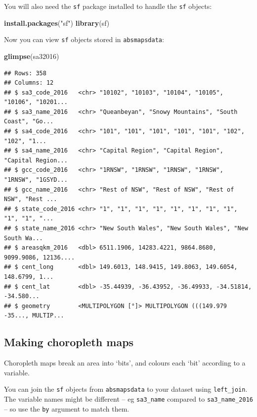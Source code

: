 \documentclass[
]{book}
\newenvironment{Shaded}{\begin{snugshade}}{\end{snugshade}}
\newcommand{\KeywordTok}[1]{\textcolor[rgb]{0.13,0.29,0.53}{\textbf{#1}}}
\newcommand{\NormalTok}[1]{#1}
\newcommand{\StringTok}[1]{\textcolor[rgb]{0.31,0.60,0.02}{#1}}
\begin{document}
You will also need the \texttt{sf} package installed to handle the \texttt{sf} objects:

\begin{Shaded}
\begin{Highlighting}[]
\KeywordTok{install.packages}\NormalTok{(}\StringTok{"sf"}\NormalTok{)}
\KeywordTok{library}\NormalTok{(sf)}
\end{Highlighting}
\end{Shaded}

Now you can view \texttt{sf} objects stored in \texttt{absmapsdata}:

\begin{Shaded}
\begin{Highlighting}[]
\KeywordTok{glimpse}\NormalTok{(sa32016)}
\end{Highlighting}
\end{Shaded}

\begin{verbatim}
## Rows: 358
## Columns: 12
## $ sa3_code_2016   <chr> "10102", "10103", "10104", "10105", "10106", "10201...
## $ sa3_name_2016   <chr> "Queanbeyan", "Snowy Mountains", "South Coast", "Go...
## $ sa4_code_2016   <chr> "101", "101", "101", "101", "101", "102", "102", "1...
## $ sa4_name_2016   <chr> "Capital Region", "Capital Region", "Capital Region...
## $ gcc_code_2016   <chr> "1RNSW", "1RNSW", "1RNSW", "1RNSW", "1RNSW", "1GSYD...
## $ gcc_name_2016   <chr> "Rest of NSW", "Rest of NSW", "Rest of NSW", "Rest ...
## $ state_code_2016 <chr> "1", "1", "1", "1", "1", "1", "1", "1", "1", "1", "...
## $ state_name_2016 <chr> "New South Wales", "New South Wales", "New South Wa...
## $ areasqkm_2016   <dbl> 6511.1906, 14283.4221, 9864.8680, 9099.9086, 12136....
## $ cent_long       <dbl> 149.6013, 148.9415, 149.8063, 149.6054, 148.6799, 1...
## $ cent_lat        <dbl> -35.44939, -36.43952, -36.49933, -34.51814, -34.580...
## $ geometry        <MULTIPOLYGON [°]> MULTIPOLYGON (((149.979 -35..., MULTIP...
\end{verbatim}

\hypertarget{making-choropleth-maps}{%
\subsection{Making choropleth maps}\label{making-choropleth-maps}}

Choropleth maps break an area into `bits', and colours each `bit' according to a variable.

You can join the \texttt{sf} objects from \texttt{absmapsdata} to your dataset using \texttt{left\_join}. The variable names might be different -- eg \texttt{sa3\_name} compared to \texttt{sa3\_name\_2016} -- so use the \texttt{by} argument to match them.
\end{document}

